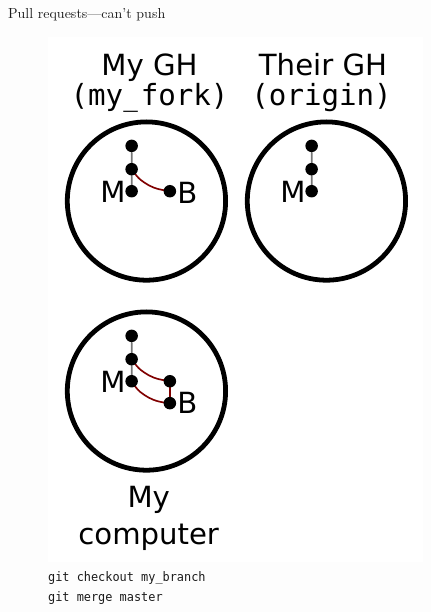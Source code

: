 \begin{frame}{Pull requests---can't push}
  \begin{figure}
    \includegraphics{fork_009.pdf}
    \\ \texttt{git checkout my\_branch}
    \\ \texttt{git merge master}
  \end{figure}
\end{frame}

